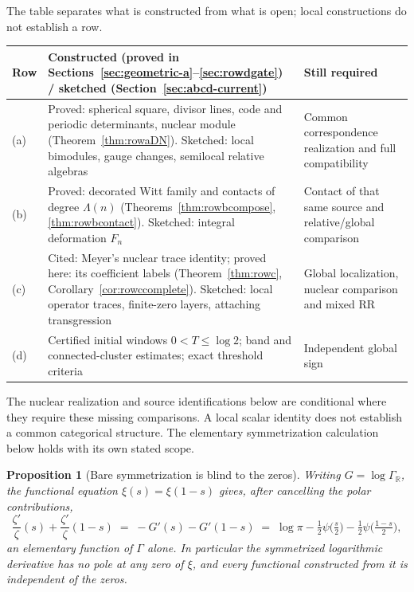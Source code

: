 \documentclass[11pt]{amsart}
\newtheorem{proposition}[theorem]{Proposition}
\theoremstyle{definition}
\theoremstyle{remark}
\begin{document}
The table separates what is constructed from what is open; local
constructions do not establish a row.
\begin{center}
\begin{tabularx}{\textwidth}{lYY}
\toprule
Row & Constructed (proved in Sections~\ref{sec:geometric-a}--\ref{sec:rowdgate}) / sketched (Section~\ref{sec:abcd-current}) & Still required \\
\midrule
(a) & Proved: spherical square, divisor lines, code and periodic determinants, nuclear module (Theorem~\ref{thm:rowaDN}). Sketched: local bimodules, gauge changes, semilocal relative algebras & Common correspondence realization and full compatibility \\
(b) & Proved: decorated Witt family and contacts of degree $\Lambda(n)$ (Theorems~\ref{thm:rowbcompose}, \ref{thm:rowbcontact}). Sketched: integral deformation $F_n$ & Contact of that same source and relative/global comparison \\
(c) & Cited: Meyer's nuclear trace identity; proved here: its coefficient labels (Theorem~\ref{thm:rowc}, Corollary~\ref{cor:rowccomplete}). Sketched: local operator traces, finite-zero layers, attaching transgression & Global localization, nuclear comparison and mixed RR \\
(d) & Certified initial windows $0<T\le\log2$; band and connected-cluster estimates; exact threshold criteria & Independent global sign \\
\bottomrule
\end{tabularx}
\end{center}
The nuclear realization and source identifications below are conditional
where they require these missing comparisons. A local scalar identity does
not establish a common categorical structure. The elementary symmetrization
calculation below holds with its own stated scope.

\begin{proposition}[Bare symmetrization is blind to the zeros]
\label{prop:symmetrizationblind}
Writing $G=\log\Gamma_{\mathbb R}$, the functional equation
$\xi(s)=\xi(1-s)$ gives, after cancelling the polar contributions,
\begin{equation}
\label{eq:collapse}
 \frac{\zeta'}{\zeta}(s)+\frac{\zeta'}{\zeta}(1-s)
 \;=\;-G'(s)-G'(1-s)
 \;=\;\log\pi-\tfrac12\psi\!\big(\tfrac s2\big)
 -\tfrac12\psi\!\big(\tfrac{1-s}2\big),
\end{equation}
an elementary function of $\Gamma$ alone.  In particular the symmetrized
logarithmic derivative has no pole at any zero of $\xi$, and every functional
constructed from it is independent of the zeros.
\end{proposition}
\end{document}
